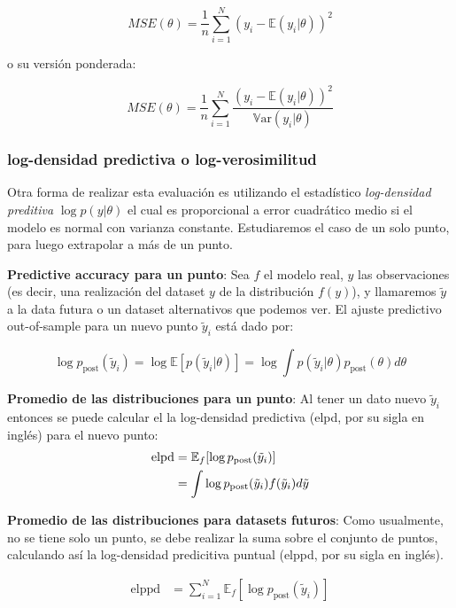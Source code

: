 \begin{equation}
MSE(\theta) = \frac{1}{n}\sum_{i=1}^N (y_i-\mathbb{E}(y_i|\theta))^2
\end{equation}

o su versión ponderada:

\begin{equation}
MSE(\theta) = \frac{1}{n}\sum_{i=1}^N \frac{(y_i-\mathbb{E}(y_i|\theta))^2}{\mathbb{V}\text{ar}(y_i|\theta)}
\end{equation}

\subsubsection{log-densidad predictiva o log-verosimilitud}
Otra forma de realizar esta evaluación es utilizando el estadístico \emph{log-densidad preditiva} $\log p(y|\theta)$ el cual es proporcional a error cuadrático medio si el modelo es normal con varianza constante. Estudiaremos el caso de un solo punto, para luego extrapolar a más de un punto.

\textbf{Predictive accuracy para un punto}: Sea $f$ el modelo real, $y$ las observaciones (es decir, una realización del dataset $y$ de la distribución $f(y)$), y llamaremos $\tilde{y}$ a la data futura o un dataset alternativos que podemos ver. El ajuste predictivo out-of-sample para un nuevo punto $\tilde{y}_i$ está dado por:

\begin{equation}
\log p_{\text{post}}(\tilde{y}_i) = \log \mathbb{E}[p(\tilde{y}_i|\theta)] = \log \int p(\tilde{y}_i|\theta)p_{\text{post}}(\theta)d\theta
\end{equation}

\textbf{Promedio de las distribuciones para un punto}: Al tener un dato nuevo $\tilde{y}_i$ entonces se puede calcular el la log-densidad predictiva (elpd, por su sigla en inglés) para el nuevo punto:
\begin{align}
\notag \text{elpd} & = \mathbb{E}_f[\log p_{\text{post}}(\tilde{y}_i)]\\
& = \int \log p_{\text{post}}(\tilde{y}_i) f(\tilde{y}_i)d\tilde{y}
\end{align}

\textbf{Promedio de las distribuciones para datasets futuros}: Como usualmente, no se tiene solo un punto, se debe realizar la suma sobre el conjunto de puntos, calculando así la log-densidad predicitiva puntual (elppd, por su sigla en inglés).

\begin{align}
\text{elppd} & = \sum_{i=1}^N \mathbb{E}_f[\log p_{\text{post}}(\tilde{y}_i)]
\end{align}

